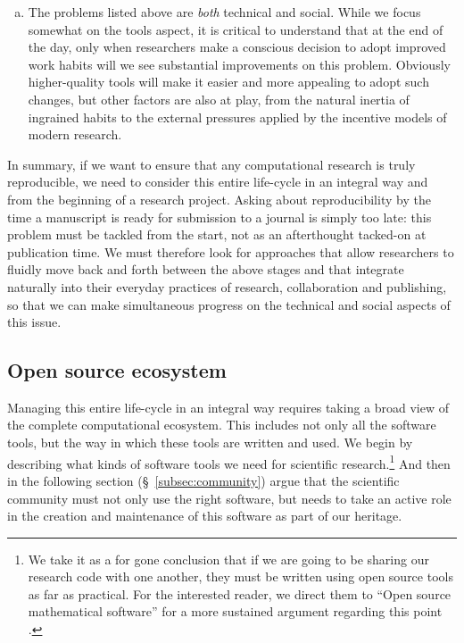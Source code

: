 \documentclass[ChapterTOCs,krantz2]{krantz} %
\begin{document}
\begin{enumerate}[(a)]
\item The problems listed above are \emph{both} technical and social.  While we
  focus somewhat on the tools aspect, it is critical to understand that at the
  end of the day, only when researchers make a conscious decision to adopt
  improved work habits will we see substantial improvements on this problem.
  Obviously higher-quality tools will make it easier and more appealing to
  adopt such changes, but other factors are also at play, from the natural
  inertia of ingrained habits to the external pressures applied by the
  incentive models of modern research.
\end{enumerate}

In summary, if we want to ensure that any computational research is truly
reproducible, we need to consider this entire life-cycle in an integral way and
from the beginning of a research project.  Asking about reproducibility by the
time a manuscript is ready for submission to a journal is simply too late: this
problem must be tackled from the start, not as an afterthought tacked-on at
publication time.  We must therefore look for approaches that allow researchers
to fluidly move back and forth between the above stages and that integrate
naturally into their everyday practices of research, collaboration and
publishing, so that we can make simultaneous progress on the technical and
social aspects of this issue.

\subsection{Open source ecosystem}

Managing this entire life-cycle in an integral way requires taking a broad view
of the complete computational ecosystem. This includes not only all the
software tools, but the way in which these tools are written and used. We begin
by describing what kinds of software tools we need for scientific
research.\footnote{We take it as a for gone conclusion that if we are going to
 be sharing our research code with one another, they must be written using open
 source tools as far as practical. For the interested reader, we direct them to
 ``Open source mathematical software'' for a more sustained argument regarding
 this point \cite{joyner2007open}.} And then in the following section
(§~\ref{subsec:community}) argue that the scientific community must not only
use the right software, but needs to take an active role in the creation and
maintenance of this software as part of our heritage.
\end{document}
